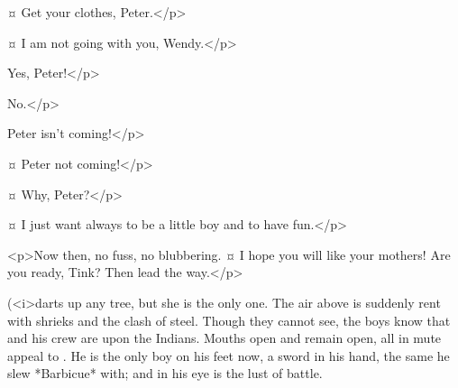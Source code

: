 \begin{drama}

\wendyspeaks {}¤
Get your clothes, Peter.</p>

\peterspeaks {}¤
I am not going with you, Wendy.</p>

\wendyspeaks
Yes, Peter!</p>

\peterspeaks
No.</p>


\wendyspeaks
Peter isn't coming!</p>


\johnspeaks {}¤
Peter not coming!</p>

\tootlesspeaks {}¤
Why, Peter?</p>

\peterspeaks {}¤
I just want always to be a little boy and to have fun.</p>


<p>Now then, no fuss, no blubbering.
¤
I hope you will like your mothers!
Are you ready, Tink?
Then lead the way.</p>

\begin{stagedir}
(\tink <i>darts up any tree, but she is the only one.
The air above is suddenly rent with shrieks and the clash of steel.
Though they cannot see, the boys know that \hook and his crew are upon the Indians.
Mouths open and remain open, all in mute appeal to \peter.
He is the only boy on his feet now, a sword in his hand, the same he slew *Barbicue* with;
and in his eye is the lust of battle.


\end{stagedir}
\end{drama}
